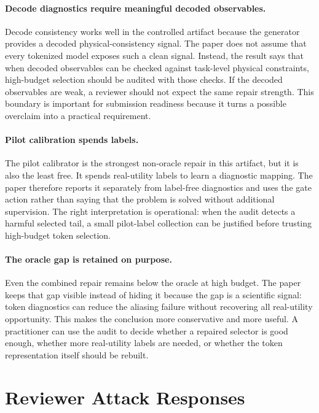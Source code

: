 \paragraph{Decode diagnostics require meaningful decoded observables.}
Decode consistency works well in the controlled artifact because the generator provides a decoded physical-consistency signal. The paper does not assume that every tokenized model exposes such a clean signal. Instead, the result says that when decoded observables can be checked against task-level physical constraints, high-budget selection should be audited with those checks. If the decoded observables are weak, a reviewer should not expect the same repair strength. This boundary is important for submission readiness because it turns a possible overclaim into a practical requirement.

\paragraph{Pilot calibration spends labels.}
The pilot calibrator is the strongest non-oracle repair in this artifact, but it is also the least free. It spends real-utility labels to learn a diagnostic mapping. The paper therefore reports it separately from label-free diagnostics and uses the gate action \VThreeGateAction{} rather than saying that the problem is solved without additional supervision. The right interpretation is operational: when the audit detects a harmful selected tail, a small pilot-label collection can be justified before trusting high-budget token selection.

\paragraph{The oracle gap is retained on purpose.}
Even the combined repair remains below the oracle at high budget. The paper keeps that gap visible instead of hiding it because the gap is a scientific signal: token diagnostics can reduce the aliasing failure without recovering all real-utility opportunity. This makes the conclusion more conservative and more useful. A practitioner can use the audit to decide whether a repaired selector is good enough, whether more real-utility labels are needed, or whether the token representation itself should be rebuilt.

\section{Reviewer Attack Responses}
\label{app:attack-responses}

